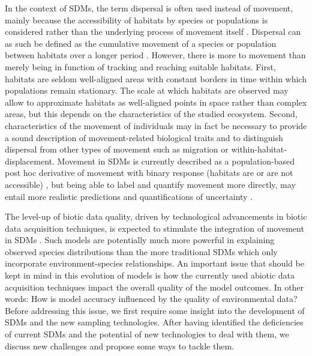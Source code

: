 \documentclass[12pt,authoryear]{elsarticle}
\begin{document}
In the context of SDMs, the term dispersal is often used instead of movement, mainly because the accessibility of habitats by species or populations is considered rather than the underlying process of movement itself \citep{Datry2016,Austin2002,Elith2006,Guisan2005}. Dispersal can as such be defined as the cumulative movement of a species or population between habitats over a longer period \citep{Soberon2005,Guisan2005,Holloway2016}. However, there is more to movement than merely being in function of tracking and reaching suitable habitats. First, habitats are seldom well-aligned areas with constant borders in time within which populations remain stationary. The scale at which habitats are observed may allow to approximate habitats as well-aligned points in space rather than complex areas, but this depends on the characteristics of the studied ecosystem. Second, characteristics of the movement of individuals may in fact be necessary to provide a sound description of movement-related biological traits and to distinguish dispersal from other types of movement such as migration or within-habitat-displacement. Movement in SDMs is currently described as a population-based post hoc derivative of movement with binary response (habitats are or are not accessible) \citep{Guisan2006}, but being able to label and quantify movement more directly, may entail more realistic predictions and quantifications of uncertainty \citep{Holloway2016,Uribe-Rivera2017,Singer2016,Dedecker2006}. 

The level-up of biotic data quality, driven by technological advancements in biotic data acquisition techniques, is expected to stimulate the integration of movement in SDMs \citep{Guisan2005,Thuiller2013}. Such models are potentially much more powerful in explaining observed species distributions than the more traditional SDMs which only incorporate environment-species relationships. An important issue that should be kept in mind in this evolution of models is how the currently used abiotic data acquisition techniques impact the overall quality of the model outcomes. In other words: How is model accuracy influenced by the quality of environmental data? Before addressing this issue, we first require some insight into the development of SDMs and the new sampling technologies. After having identified the deficiencies of current SDMs and the potential of new technologies to deal with them, we discuss new challenges and propose some ways to tackle them. 

\vspace{5mm}
\end{document}
